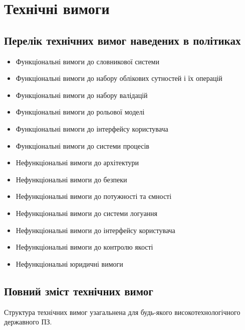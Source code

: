 \documentclass{article}
\begin{document}
\newpage
\section{Технічні вимоги}

\subsection{Перелік технічних вимог наведених в політиках}

\begin{itemize}
\item Функціональні вимоги до словникової системи
\item Функціональні вимоги до набору облікових сутностей і їх операцій
\item Функціональні вимоги до набору валідацій
\item Функціональні вимоги до рольової моделі
\item Функціональні вимоги до інтерфейсу користувача
\item Функціональні вимоги до системи процесів
\item Нефункціональні вимоги до архітектури
\item Нефункціональні вимоги до безпеки
\item Нефункціональні вимоги до потужності та ємності
\item Нефункціональні вимоги до системи логуання
\item Нефункціональні вимоги до інтерфейсу користувача
\item Нефункціональні вимоги до контролю якості
\item Нефункціональні юридичні вимоги
\end{itemize}

\newpage
\subsection{Повний зміст технічних вимог}
Структура технічних вимог узагальнена для будь-якого високотехнологічного державного ПЗ.
\end{document}
